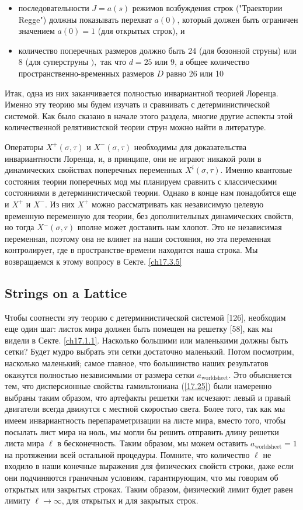 \documentclass[main.tex]{subfiles}
\begin{document}
\begin{itemize}
    \item последовательности $J=a(s)$ режимов возбуждения строк ("Траектории Regge") должны показывать перехват $a(0)$, который должен быть ограничен значением $a(0)=1$ (для открытых строк), и 
    \item количество поперечных размеров должно быть 24 (для бозонной струны) или 8 (для суперструны $),$ так что $d=25$ или $9$, а общее количество пространственно-временных размеров $D$ равно 26 или 10
\end{itemize}

Итак, одна из них заканчивается полностью инвариантной теорией Лоренца. Именно эту теорию мы будем изучать и сравнивать с детерминистической системой. Как было сказано в начале этого раздела, многие другие аспекты этой количественной релятивистской теории струн можно найти в литературе.

Операторы $X^{+}(\sigma, \tau)$ и $X^{-}(\sigma, \tau)$ необходимы для доказательства инвариантности Лоренца, и, в принципе, они не играют никакой роли в динамических свойствах поперечных переменных $X^{i}(\sigma, \tau) .$ Именно квантовые состояния теории поперечных мод мы планируем сравнить с классическими состояниями в детерминистической теории. Однако в конце нам понадобятся еще и $X^{+}$ и $X^{-}$. Из них $X^{+}$ можно рассматривать как независимую целевую временную переменную для теории, без дополнительных динамических свойств, но тогда $X^{-}(\sigma, \tau)$ вполне может доставить нам хлопот. Это не независимая переменная, поэтому она не влияет на наши состояния, но эта переменная контролирует, где в пространстве-времени находится наша строка. Мы возвращаемся к этому вопросу в Секте. \ref{ch17.3.5}


\subsection{Strings on a Lattice}

Чтобы соотнести эту теорию с детерминистической системой [126], необходим еще один шаг: листок мира должен быть помещен на решетку [58], как мы видели в Секте. \ref{ch17.1.1}. Насколько большими или маленькими должны быть сетки? Будет мудро выбрать эти сетки достаточно маленький. Потом посмотрим, насколько маленький; самое главное, что большинство наших результатов окажутся полностью независимыми от размера сетки $a_\text{worldsheet}$. Это объясняется тем, что дисперсионные свойства гамильтониана (\ref{17.25}) были намеренно выбраны таким образом, что артефакты решетки там исчезают: левый и правый двигатели всегда движутся с местной скоростью света. Более того, так как мы имеем инвариантность перепараметризации на листе мира, вместо того, чтобы посылать лист мира на ноль, мы могли бы решить отправить длину решетки листа мира $\ell$ в бесконечность. Таким образом, мы можем оставить $a_\text{worldsheet} = 1$ на протяжении всей остальной процедуры. Помните, что количество $\ell$ не входило в наши конечные выражения для физических свойств строки, даже если они подчиняются граничным условиям, гарантирующим, что мы говорим об открытых или закрытых строках. Таким образом, физический лимит будет равен лимиту $\ell \rightarrow \infty$, для открытых и для закрытых строк.
\end{document}
